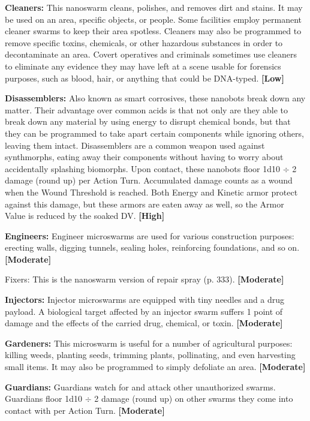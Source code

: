 \textbf{Cleaners:} This nanoswarm cleans, polishes, and removes dirt and stains. It may be used on an area, specific objects, or people. Some facilities employ permanent cleaner swarms to keep their area spotless. Cleaners may also be programmed to remove specific toxins, chemicals, or other hazardous substances in order to decontaminate an area. Covert operatives and criminals sometimes use cleaners to eliminate any evidence they may have left at a scene usable for forensics purposes, such as blood, hair, or anything that could be DNA-typed. \textbf{[Low]}

\textbf{Disassemblers:} Also known as smart corrosives, these nanobots break down any matter. Their advantage over common acids is that not only are they able to break down any material by using energy to disrupt chemical bonds, but that they can be programmed to take apart certain components while ignoring others, leaving them intact. Disassemblers are a common weapon used against synthmorphs, eating away their components without having to worry about accidentally splashing biomorphs. Upon contact, these nanobots floor 1d10 $\div$ 2 damage (round up) per Action Turn. Accumulated damage counts as a wound when the Wound Threshold is reached. Both Energy and Kinetic armor protect against this damage, but these armors are eaten away as well, so the Armor Value is reduced by the soaked DV. \textbf{[High]}

\textbf{Engineers:} Engineer microswarms are used for various construction purposes: erecting walls, digging tunnels, sealing holes, reinforcing foundations, and so on. \textbf{[Moderate]}

Fixers: This is the nanoswarm version of repair spray (p. 333). \textbf{[Moderate]}

\textbf{Injectors:} Injector microswarms are equipped with tiny needles and a drug payload. A biological target affected by an injector swarm suffers 1 point of damage and the effects of the carried drug, chemical, or toxin. \textbf{[Moderate]}

\textbf{Gardeners:} This microswarm is useful for a number of agricultural purposes: killing weeds, planting seeds, trimming plants, pollinating, and even harvesting small items. It may also be programmed to simply defoliate an area. \textbf{[Moderate]}

\textbf{Guardians:} Guardians watch for and attack other unauthorized swarms. Guardians floor 1d10 $\div$ 2 damage (round up) on other swarms they come into contact with per Action Turn. \textbf{[Moderate]}

